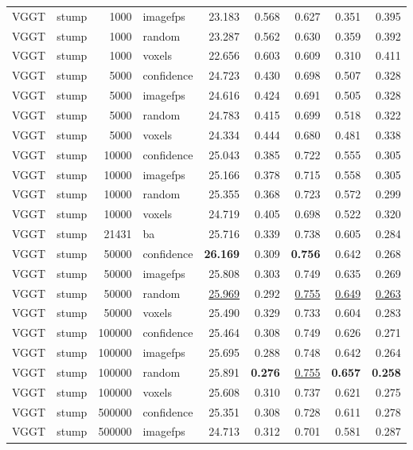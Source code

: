 \begin{table}[H]
\begin{tabular}{llrlrrrrr}
VGGT & stump & 1000 & imagefps & 23.183 & 0.568 & 0.627 & 0.351 & 0.395 \\
VGGT & stump & 1000 & random & 23.287 & 0.562 & 0.630 & 0.359 & 0.392 \\
VGGT & stump & 1000 & voxels & 22.656 & 0.603 & 0.609 & 0.310 & 0.411 \\
VGGT & stump & 5000 & confidence & 24.723 & 0.430 & 0.698 & 0.507 & 0.328 \\
VGGT & stump & 5000 & imagefps & 24.616 & 0.424 & 0.691 & 0.505 & 0.328 \\
VGGT & stump & 5000 & random & 24.783 & 0.415 & 0.699 & 0.518 & 0.322 \\
VGGT & stump & 5000 & voxels & 24.334 & 0.444 & 0.680 & 0.481 & 0.338 \\
VGGT & stump & 10000 & confidence & 25.043 & 0.385 & 0.722 & 0.555 & 0.305 \\
VGGT & stump & 10000 & imagefps & 25.166 & 0.378 & 0.715 & 0.558 & 0.305 \\
VGGT & stump & 10000 & random & 25.355 & 0.368 & 0.723 & 0.572 & 0.299 \\
VGGT & stump & 10000 & voxels & 24.719 & 0.405 & 0.698 & 0.522 & 0.320 \\
VGGT & stump & 21431 & ba & 25.716 & 0.339 & 0.738 & 0.605 & 0.284 \\
VGGT & stump & 50000 & confidence & \textbf{26.169} & 0.309 & \textbf{0.756} & 0.642 & 0.268 \\
VGGT & stump & 50000 & imagefps & 25.808 & 0.303 & 0.749 & 0.635 & 0.269 \\
VGGT & stump & 50000 & random & \underline{25.969} & 0.292 & \underline{0.755} & \underline{0.649} & \underline{0.263} \\
VGGT & stump & 50000 & voxels & 25.490 & 0.329 & 0.733 & 0.604 & 0.283 \\
VGGT & stump & 100000 & confidence & 25.464 & 0.308 & 0.749 & 0.626 & 0.271 \\
VGGT & stump & 100000 & imagefps & 25.695 & 0.288 & 0.748 & 0.642 & 0.264 \\
VGGT & stump & 100000 & random & 25.891 & \textbf{0.276} & \underline{0.755} & \textbf{0.657} & \textbf{0.258} \\
VGGT & stump & 100000 & voxels & 25.608 & 0.310 & 0.737 & 0.621 & 0.275 \\
VGGT & stump & 500000 & confidence & 25.351 & 0.308 & 0.728 & 0.611 & 0.278 \\
VGGT & stump & 500000 & imagefps & 24.713 & 0.312 & 0.701 & 0.581 & 0.287 \\

\end{tabular}
\end{table}
